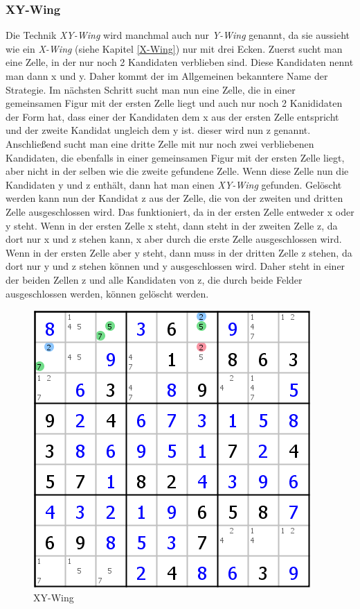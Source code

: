 \subsubsection{XY-Wing}
Die Technik \textit{XY-Wing} wird manchmal auch nur \textit{Y-Wing} genannt, da sie aussieht wie ein \textit{X-Wing} (siehe Kapitel \ref{X-Wing}) nur mit drei Ecken. Zuerst sucht man eine Zelle, in der nur noch 2 Kandidaten verblieben sind. Diese Kandidaten nennt man dann x und y. Daher kommt der im Allgemeinen bekanntere Name der Strategie. Im nächsten Schritt sucht man nun eine Zelle, die in einer gemeinsamen Figur mit der ersten Zelle liegt und auch nur noch 2 Kanididaten der Form hat, dass einer der Kandidaten dem x aus der ersten Zelle entspricht und der zweite Kandidat ungleich dem y ist. dieser wird nun z genannt. Anschließend sucht man eine dritte Zelle mit nur noch zwei verbliebenen Kandidaten, die ebenfalls in einer gemeinsamen Figur mit der ersten Zelle liegt, aber nicht in der selben wie die zweite gefundene Zelle. Wenn diese Zelle nun die Kandidaten y und z enthält, dann hat man einen \textit{XY-Wing} gefunden. Gelöscht werden kann nun der Kandidat z aus der Zelle, die von der zweiten und dritten Zelle ausgeschlossen wird. Das funktioniert, da in der ersten Zelle entweder x oder y steht. Wenn in der ersten Zelle x steht, dann steht in der zweiten Zelle z, da dort nur x und z stehen kann, x aber durch die erste Zelle ausgeschlossen wird. Wenn in der ersten Zelle aber y steht, dann muss in der dritten Zelle z stehen, da dort nur y und z stehen können und y ausgeschlossen wird. Daher steht in einer der beiden Zellen z und alle Kandidaten von z, die durch beide Felder ausgeschlossen werden, können gelöscht werden.

\begin{figure}[h]
\begin{center}
\includegraphics{./img/XY_Wing.png}
\caption{XY-Wing}
\end{center}
\end{figure}

